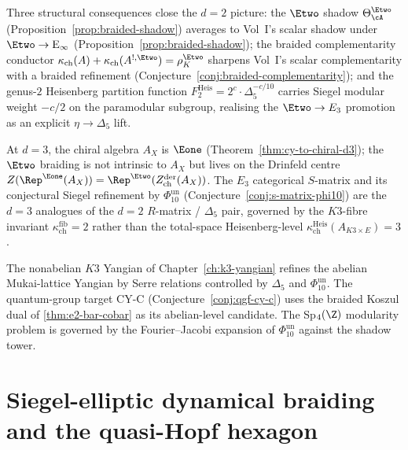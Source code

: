 Three structural consequences close the $d = 2$ picture: the $\Etwo$
shadow $\Theta^{\Etwo}_\cA$ (Proposition~\ref{prop:braided-shadow})
averages to Vol~I's scalar shadow under
$\Etwo \to \mathrm{E}_\infty$ (Proposition~\ref{prop:braided-shadow});
the braided complementarity conductor
$\kappa_{\mathrm{ch}}(A) + \kappa_{\mathrm{ch}}(A^{!,\Etwo}) = \rho_K^{\Etwo}$
sharpens Vol~I's scalar complementarity with a braided refinement
(Conjecture~\ref{conj:braided-complementarity}); and the genus-$2$
Heisenberg partition function
$F_2^{\mathrm{Heis}} = 2^c \cdot \Delta_5^{-c/10}$
carries Siegel modular weight $-c/2$ on the paramodular subgroup,
realising the $\Etwo \to E_3$ promotion as an explicit
$\eta \to \Delta_5$ lift.

At $d = 3$, the chiral algebra $A_X$ is $\Eone$
(Theorem~\ref{thm:cy-to-chiral-d3}); the $\Etwo$ braiding is not
intrinsic to $A_X$ but lives on the Drinfeld centre
$Z(\Rep^{\Eone}(A_X)) = \Rep^{\Etwo}(Z^{\mathrm{der}}_{\mathrm{ch}}(A_X))$.
The $E_3$ categorical $S$-matrix and its conjectural Siegel refinement
by $\Phi_{10}^{\mathrm{un}}$ (Conjecture~\ref{conj:s-matrix-phi10}) are the $d = 3$
analogues of the $d = 2$ $R$-matrix / $\Delta_5$ pair, governed by the
$K3$-fibre invariant $\kappa_{\mathrm{ch}}^{\mathrm{fib}} = 2$ rather
than the total-space Heisenberg-level $\kappa_{\mathrm{ch}}^{\mathrm{Heis}}(A_{K3 \times E}) = 3$.

The nonabelian $K3$ Yangian of Chapter~\ref{ch:k3-yangian} refines the
abelian Mukai-lattice Yangian by Serre relations controlled by
$\Delta_5$ and $\Phi_{10}^{\mathrm{un}}$. The quantum-group target CY-C
(Conjecture~\ref{conj:qgf-cy-c}) uses the braided Koszul dual of
\ref{thm:e2-bar-cobar} as its abelian-level candidate. The
Sp$_4(\Z)$ modularity problem is governed by the Fourier--Jacobi
expansion of $\Phi_{10}^{\mathrm{un}}$ against the shadow tower.

\section{Siegel-elliptic dynamical braiding and the quasi-Hopf hexagon}
\label{sec:bfac-siegel-elliptic-braiding}

